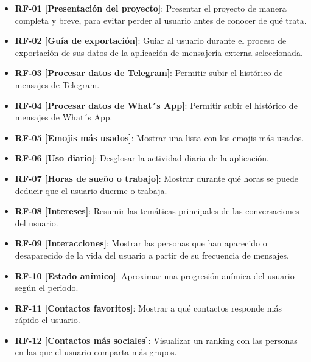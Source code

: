 
\begin{itemize}
    \item \textbf{RF-01 [Presentación del proyecto]}: Presentar el proyecto de manera completa y breve, para evitar perder al usuario antes de conocer de qué trata.
    \item \textbf{RF-02 [Guía de exportación]}: Guiar al usuario durante el proceso de exportación de sus datos de la aplicación de mensajería externa seleccionada.
    \item \textbf{RF-03 [Procesar datos de Telegram]}: Permitir subir el histórico de mensajes de Telegram.
    \item \textbf{RF-04 [Procesar datos de What´s App]}: Permitir subir el histórico de mensajes de What´s App.
    \item \textbf{RF-05 [Emojis más usados]}: Mostrar una lista con los emojis más usados.
    \item \textbf{RF-06 [Uso diario]}: Desglosar la actividad diaria de la aplicación.
    \item \textbf{RF-07 [Horas de sueño o trabajo]}: Mostrar durante qué horas se puede deducir que el usuario duerme o trabaja.
    \item \textbf{RF-08 [Intereses]}: Resumir las temáticas principales de las conversaciones del usuario.
    \item \textbf{RF-09 [Interacciones]}: Mostrar las personas que han aparecido o desaparecido de la vida del usuario a partir de su frecuencia de mensajes.
    \item \textbf{RF-10 [Estado anímico]}: Aproximar una progresión anímica del usuario según el periodo.
    \item \textbf{RF-11 [Contactos favoritos]}: Mostrar a qué contactos responde más rápido el usuario.
    \item \textbf{RF-12 [Contactos más sociales]}: Visualizar un ranking con las personas en las que el usuario comparta más grupos.
\end{itemize}
